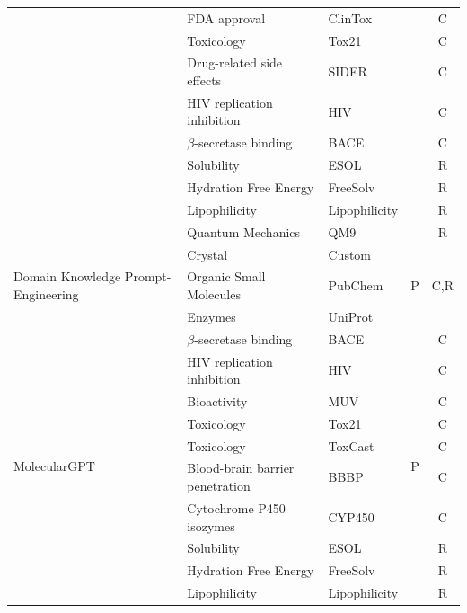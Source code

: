 \documentclass[11pt, oneside]{article}
\begin{document}
\begin{table}[htbp]
{\begin{tabular}{lllcc}
        & FDA approval & ClinTox\autocite{wu2018moleculenet} & & C \\
        & Toxicology & Tox21\autocite{richard_tox21_2021} & & C \\
        & Drug-related side effects & SIDER\autocite{kuhn_sider_2016} & & C \\
        & HIV replication inhibition & HIV\autocite{wu2018moleculenet} & & C \\
        & $\beta$-secretase binding & BACE\autocite{wu2018moleculenet} & & C \\
        & Solubility & ESOL\autocite{wu2018moleculenet} & & R \\
        & Hydration Free Energy & FreeSolv\autocite{mobley_freesolv_2014} & & R \\
        & Lipophilicity & Lipophilicity\autocite{wu2018moleculenet} & & R \\
        & Quantum Mechanics & QM9\autocite{wu2018moleculenet} & & R \\
        \midrule
        \multirow{3}{*}{Domain Knowledge Prompt-Engineering\autocite{liu2025integrating}} & Crystal & Custom\autocite{liu2025integrating}& \multirow{3}{*}{P}   &\multirow{3}{*}{C,R}\\
        & Organic Small Molecules & PubChem\\
        & Enzymes & UniProt\\
        \midrule
        \multirow{10}{*}{MolecularGPT\autocite{liu2024moleculargpt}} & $\beta$-secretase binding & BACE \autocite{wu2018moleculenet} & \multirow{10}{*}{P} & C\\
        & HIV replication inhibition & HIV\autocite{wu2018moleculenet} & & C\\
        & Bioactivity & MUV \autocite{rohrer2009maximum} & & C\\
        & Toxicology & Tox21 \autocite{richard_tox21_2021} & & C \\
        & Toxicology & ToxCast \autocite{us2015toxicity} & & C\\
        & Blood-brain barrier penetration & BBBP\autocite{sakiyama_prediction_2021} & & C\\
        & Cytochrome P450 isozymes & CYP450 \autocite{ni2025curated} & & C\\
        & Solubility & ESOL \autocite{delaneyesol2004} & & R\\
        & Hydration Free Energy & FreeSolv \autocite{mobley_freesolv_2014}& & R\\
        & Lipophilicity& Lipophilicity\autocite{wu2018moleculenet} & & R\\

\end{tabular}}
\end{table}
\end{document}
